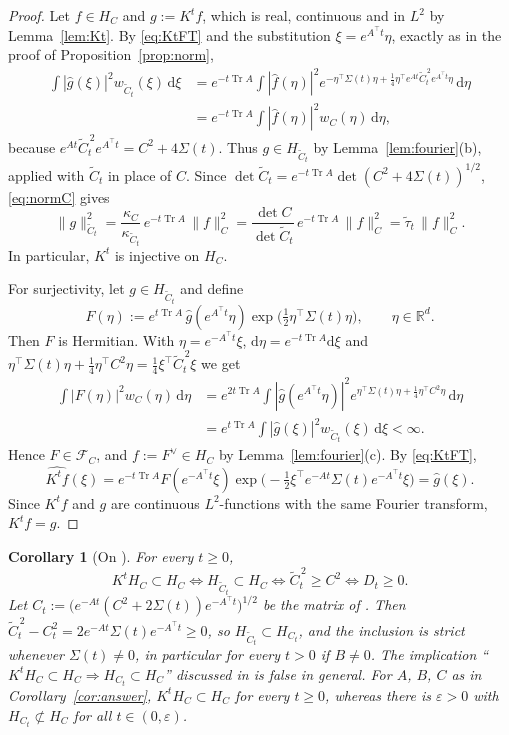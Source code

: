 \documentclass[11pt]{amsart}
\numberwithin{equation}{section}
\newtheorem{corollary}[theorem]{Corollary}
\theoremstyle{definition}
\theoremstyle{remark}
\newcommand{\R}{\mathbb{R}}
\newcommand{\Tr}{\operatorname{Tr}}
\newcommand{\dd}{\,\mathrm{d}}
\newcommand{\FC}[1]{\mathcal{F}_{#1}}
\newcommand{\Ct}{\widetilde{C}_t}
\newcommand{\taut}{\widetilde{\tau}_t}
\newcommand{\hatf}[1]{\widehat{#1}}
\newcommand{\tp}{\top}
\begin{document}
\begin{proof}
Let $f\in H_C$ and $g:=K^tf$, which is real, continuous and in $L^2$ by Lemma~\ref{lem:Kt}. By \eqref{eq:KtFT} and
the substitution $\xi=e^{A^\tp t}\eta$, exactly as in the proof of Proposition~\ref{prop:norm},
\begin{align*}
\int|\hatf g(\xi)|^2w_{\Ct}(\xi)\dd\xi
&=e^{-t\Tr A}\int|\hatf f(\eta)|^2
e^{-\eta^\tp\Sigma(t)\eta+\frac14\eta^\tp e^{At}\Ct^{\,2}e^{A^\tp t}\eta}\dd\eta\\
&=e^{-t\Tr A}\int|\hatf f(\eta)|^2w_C(\eta)\dd\eta ,
\end{align*}
because $e^{At}\Ct^{\,2}e^{A^\tp t}=C^2+4\Sigma(t)$. Thus $g\in H_{\Ct}$ by Lemma~\ref{lem:fourier}(b), applied with
$\Ct$ in place of $C$. Since $\det\Ct=e^{-t\Tr A}\det(C^2+4\Sigma(t))^{1/2}$, \eqref{eq:normC} gives
\[
\|g\|_{\Ct}^2=\frac{\kappa_C}{\kappa_{\Ct}}\,e^{-t\Tr A}\,\|f\|_C^2=\frac{\det C}{\det\Ct}\,e^{-t\Tr A}\,\|f\|_C^2
=\taut\,\|f\|_C^2 .
\]
In particular, $K^t$ is injective on $H_C$.

For surjectivity, let $g\in H_{\Ct}$ and define
\[
F(\eta):=e^{t\Tr A}\,\hatf g(e^{A^\tp t}\eta)\exp\bigl(\tfrac12\eta^\tp\Sigma(t)\eta\bigr),\qquad\eta\in\R^d .
\]
Then $F$ is Hermitian. With $\eta=e^{-A^\tp t}\xi$, $\mathrm d\eta=e^{-t\Tr A}\mathrm d\xi$ and
$\eta^\tp\Sigma(t)\eta+\frac14\eta^\tp C^2\eta=\frac14\xi^\tp\Ct^{\,2}\xi$ we get
\begin{align*}
\int|F(\eta)|^2w_C(\eta)\dd\eta
&=e^{2t\Tr A}\int|\hatf g(e^{A^\tp t}\eta)|^2e^{\eta^\tp\Sigma(t)\eta+\frac14\eta^\tp C^2\eta}\dd\eta\\
&=e^{t\Tr A}\int|\hatf g(\xi)|^2w_{\Ct}(\xi)\dd\xi<\infty .
\end{align*}
Hence $F\in\FC{C}$, and $f:=F^\vee\in H_C$ by Lemma~\ref{lem:fourier}(c). By \eqref{eq:KtFT},
\[
\hatf{K^tf}(\xi)=e^{-t\Tr A}F(e^{-A^\tp t}\xi)\exp\bigl(-\tfrac12\xi^\tp e^{-At}\Sigma(t)e^{-A^\tp t}\xi\bigr)=\hatf g(\xi).
\]
Since $K^tf$ and $g$ are continuous $L^2$-functions with the same Fourier transform, $K^tf=g$.
\end{proof}

\begin{corollary}[On {\cite[Remark~4.2]{PSWPN}}]\label{cor:remark42}
For every $t\ge0$,
\[
K^tH_C\subset H_C\iff H_{\Ct}\subset H_C\iff \Ct^{\,2}\ge C^2\iff D_t\ge0 .
\]
Let $C_t:=\bigl(e^{-At}(C^2+2\Sigma(t))e^{-A^\tp t}\bigr)^{1/2}$ be the matrix of \cite[(4.1)]{PSWPN}. Then
$\Ct^{\,2}-C_t^2=2e^{-At}\Sigma(t)e^{-A^\tp t}\ge0$, so $H_{\Ct}\subset H_{C_t}$, and the inclusion is strict whenever
$\Sigma(t)\ne0$, in particular for every $t>0$ if $B\ne0$. The implication
``$K^tH_C\subset H_C\Rightarrow H_{C_t}\subset H_C$'' discussed in \cite[Remark~4.2]{PSWPN} is false in general.
For $A$, $B$, $C$ as in Corollary~\ref{cor:answer}, $K^tH_C\subset H_C$ for every $t\ge0$, whereas there is $\varepsilon>0$
with $H_{C_t}\not\subset H_C$ for all $t\in(0,\varepsilon)$.
\end{corollary}
\end{document}

